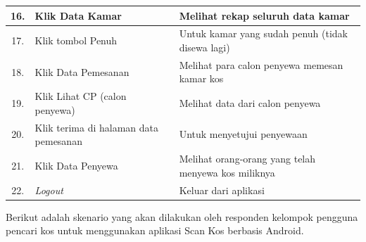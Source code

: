 \begin{enumerate}[a.]
\begin{longtable}{ |c|p{5cm}|p{7cm}| }
			\hline
			16. & Klik Data Kamar & Melihat rekap seluruh data kamar \\
			\hline
			17. & Klik tombol Penuh & Untuk kamar yang sudah penuh (tidak disewa lagi) \\
			\hline
			18. & Klik Data Pemesanan & Melihat para calon penyewa memesan kamar kos \\
			\hline
			19. & Klik Lihat CP (calon penyewa) & Melihat data dari calon penyewa \\
			\hline
			20. & Klik terima di halaman data pemesanan & Untuk menyetujui penyewaan \\
			\hline
			21. & Klik Data Penyewa & Melihat orang-orang yang telah menyewa kos miliknya \\
			\hline
			22. & \textit{Logout} & Keluar dari aplikasi \\
			\hline
		\end{longtable}
		
		Berikut adalah skenario yang akan dilakukan oleh responden kelompok pengguna pencari kos untuk menggunakan aplikasi Scan Kos berbasis Android.
		

\end{enumerate}
